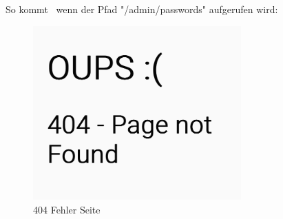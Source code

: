 So kommt \zb\ wenn der Pfad "{\ttfamily /admin/passwords}" aufgerufen wird:
    
\begin{figure}[H]
    \centering
    \includegraphics[width=80mm]{media/WebComponents/404.png}
    \caption{404 Fehler Seite}
\end{figure}